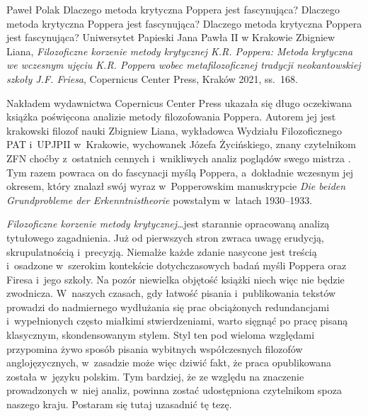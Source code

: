 \begin{newrevplenv}{Paweł Polak}
	{Dlaczego metoda krytyczna Poppera jest fascynująca?}
	{Dlaczego metoda krytyczna Poppera jest fascynująca?}
	{Dlaczego metoda krytyczna Poppera jest fascynująca?}
	{Uniwersytet Papieski Jana Pawła II w Krakowie}
	{Zbigniew Liana, \textit{Filozoficzne korzenie metody krytycznej K.R. Poppera: Metoda krytyczna we wczesnym ujęciu K.R. Poppera wobec metafilozoficznej tradycji neokantowskiej szkoły J.F. Friesa}, Copernicus Center Press, Kraków 2021, ss.~168.}





\lettrine[loversize=0.13,lines=2,lraise=-0.03,nindent=0em,findent=0.2pt]%
{N}{}akładem wydawnictwa Copernicus Center Press ukazała się długo oczekiwana książka poświęcona analizie metody filozofowania Poppera. Autorem jej jest krakowski filozof nauki Zbigniew Liana, wykładowca Wydziału Filozoficznego PAT i~UPJPII w~Krakowie, wychowanek Józefa Życińskiego, znany czytelnikom ZFN choćby z~ostatnich cennych i~wnikliwych analiz poglądów swego mistrza
\parencites[][]{liana_nauka_2019}[][]{liana_jozefa_2020}. %
 Tym razem powraca on do fascynacji myślą Poppera, a~dokładnie wczesnym jej okresem, który znalazł swój wyraz w~Popperowskim manuskrypcie \textit{Die beiden Grundprobleme der Erkenntnistheorie} powstałym w~latach 1930--1933.

\textit{Filozoficzne korzenie metody krytycznej}\ldots jest starannie opracowaną analizą tytułowego zagadnienia. Już od pierwszych stron zwraca uwagę erudycją, skrupulatnością i~precyzją. Niemalże każde zdanie nasycone jest treścią i~osadzone w~szerokim kontekście dotychczasowych badań myśli Poppera oraz Firesa i~jego szkoły. Na pozór niewielka objętość książki niech więc nie będzie zwodnicza. W~naszych czasach, gdy łatwość pisania i~publikowania tekstów prowadzi do nadmiernego wydłużania się prac obciążonych redundancjami i~wypełnionych często miałkimi stwierdzeniami, warto sięgnąć po pracę pisaną klasycznym, skondensowanym stylem. Styl ten pod wieloma względami przypomina żywo sposób pisania wybitnych współczesnych filozofów anglojęzycznych, w~zasadzie może więc dziwić fakt, że praca opublikowana została w~języku polskim. Tym bardziej, że ze względu na znaczenie prowadzonych w~niej analiz, powinna zostać udostępniona czytelnikom spoza naszego kraju. Postaram się tutaj uzasadnić tę tezę.


\end{newrevplenv}

